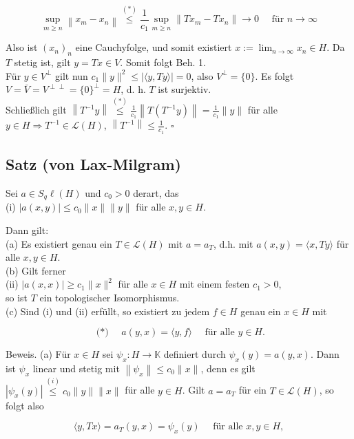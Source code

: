 \documentclass[10pt, letterpaper]{article}
\begin{document}
$$
\sup _{m \geq n}\left\|x_{m}-x_{n}\right\| \stackrel{(*)}{\leq} \frac{1}{c_{1}} \sup _{m \geq n}\left\|T x_{m}-T x_{n}\right\| \rightarrow 0 \quad \text { für } n \rightarrow \infty
$$

Also ist $\left(x_{n}\right)_{n}$ eine Cauchyfolge, und somit existiert $x:=\lim _{n \rightarrow \infty} x_{n} \in H$. Da $T$ stetig ist, gilt $y=T x \in V$. Somit folgt Beh. 1.\\
Für $y \in V^{\perp}$ gilt nun $c_{1}\|y\|^{2} \leq|\langle y, T y\rangle|=0$, also $V^{\perp}=\{0\}$. Es folgt $V=\bar{V}= V^{\perp \perp}=\{0\}^{\perp}=H$, d. h. $T$ ist surjektiv.\\
Schließlich gilt $\left\|T^{-1} y\right\| \stackrel{(*)}{\leq} \frac{1}{c_{1}}\left\|T\left(T^{-1} y\right)\right\|=\frac{1}{c_{1}}\|y\|$ für alle $y \in H \Longrightarrow T^{-1} \in \mathcal{L}(H)$, $\left\|T^{-1}\right\| \leq \frac{1}{c_{1}}$. \(\square\)

\subsection*{Satz (von Lax-Milgram)}
Sei $a \in S_{q} \ell(H)$ und $c_{0}>0$ derart, das\\
(i) $|a(x, y)| \leq c_{0}\|x\|\|y\|$ für alle $x, y \in H$.

Dann gilt:\\
(a) Es existiert genau ein $T \in \mathcal{L}(H)$ mit $a=a_{T}$, d.h. mit $a(x, y)=\langle x, T y\rangle$ für alle $x, y \in H$.\\
(b) Gilt ferner\\
(ii) $|a(x, x)| \geq c_{1}\|x\|^{2}$ für alle $x \in H$ mit einem festen $c_{1}>0$,\\
so ist $T$ ein topologischer Isomorphismus.\\
(c) Sind (i) und (ii) erfüllt, so existiert zu jedem $f \in H$ genau ein $x \in H$ mit

$$
\text { (*) } \quad a(y, x)=\langle y, f\rangle \quad \text { für alle } y \in H .
$$

Beweis. (a) Für $x \in H$ sei $\psi_{x}: H \rightarrow \mathbb{K}$ definiert durch $\psi_{x}(y)=a(y, x)$. Dann ist $\psi_{x}$ linear und stetig mit $\left\|\psi_{x}\right\| \leq c_{0}\|x\|$, denn es gilt $\left|\psi_{x}(y)\right| \stackrel{(i)}{\leq} c_{0}\|y\|\|x\|$ für alle $y \in H$. Gilt $a=a_{T}$ für ein $T \in \mathcal{L}(H)$, so folgt also

$$
\langle y, T x\rangle=a_{T}(y, x)=\psi_{x}(y) \quad \text { für alle } x, y \in H,
$$
\end{document}
